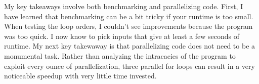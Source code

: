 \documentclass[letterpaper,11pt]{article}
\begin{document}
My key takeaways involve both benchmarking and parallelizing code.  First, I have learned that benchmarking can be a bit tricky if your runtime is too small.  When testing the loop orders, I couldn't see improvements because the program was too quick.  I now know to pick inputs that give at least a few seconds of runtime.  My next key takewaway is that parallelizing code does not need to be a monumental task.  Rather than analyzing the intracacies of the program to exploit every ounce of parallelization, three parallel for loops can result in a very noticeable speedup with very little time invested.  
\end{document}
